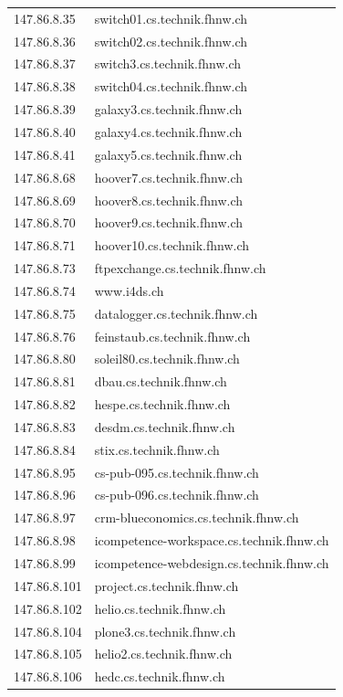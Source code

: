 \documentclass[a4paper,11pt]{scrartcl}
\begin{document}
\begin{longtable}{p{2.5cm}|p{7cm}}
	147.86.8.35 & switch01.cs.technik.fhnw.ch \\ 
	147.86.8.36 & switch02.cs.technik.fhnw.ch \\ 
	147.86.8.37 & switch3.cs.technik.fhnw.ch \\ 
	147.86.8.38 & switch04.cs.technik.fhnw.ch \\ 
	147.86.8.39 & galaxy3.cs.technik.fhnw.ch \\ 
	147.86.8.40 & galaxy4.cs.technik.fhnw.ch \\ 
	147.86.8.41 & galaxy5.cs.technik.fhnw.ch \\ 
	147.86.8.68 & hoover7.cs.technik.fhnw.ch \\ 
	147.86.8.69 & hoover8.cs.technik.fhnw.ch \\ 
	147.86.8.70 & hoover9.cs.technik.fhnw.ch \\ 
	147.86.8.71 & hoover10.cs.technik.fhnw.ch \\ 
	147.86.8.73 & ftpexchange.cs.technik.fhnw.ch \\ 
	147.86.8.74 & www.i4ds.ch \\ 
	147.86.8.75 & datalogger.cs.technik.fhnw.ch \\ 
	147.86.8.76 & feinstaub.cs.technik.fhnw.ch \\ 
	147.86.8.80 & soleil80.cs.technik.fhnw.ch \\ 
	147.86.8.81 & dbau.cs.technik.fhnw.ch \\ 
	147.86.8.82 & hespe.cs.technik.fhnw.ch \\ 
	147.86.8.83 & desdm.cs.technik.fhnw.ch \\ 
	147.86.8.84 & stix.cs.technik.fhnw.ch \\ 
	147.86.8.95 & cs-pub-095.cs.technik.fhnw.ch \\ 
	147.86.8.96 & cs-pub-096.cs.technik.fhnw.ch \\ 
	147.86.8.97 & crm-blueconomics.cs.technik.fhnw.ch \\ 
	147.86.8.98 & icompetence-workspace.cs.technik.fhnw.ch \\ 
	147.86.8.99 & icompetence-webdesign.cs.technik.fhnw.ch \\ 
	147.86.8.101 & project.cs.technik.fhnw.ch \\ 
	147.86.8.102 & helio.cs.technik.fhnw.ch \\ 
	147.86.8.104 & plone3.cs.technik.fhnw.ch \\ 
	147.86.8.105 & helio2.cs.technik.fhnw.ch \\ 
	147.86.8.106 & hedc.cs.technik.fhnw.ch \\ 

\end{longtable}
\end{document}

